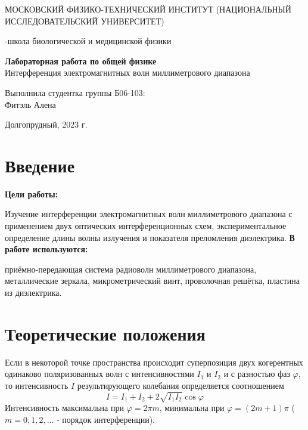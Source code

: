\documentclass[a4paper,12pt]{article}
\begin{document}
\def\figurename{Рисунок}
\begin{titlepage}
\begin{center}
    {\large МОСКОВСКИЙ ФИЗИКО-ТЕХНИЧЕСКИЙ ИНСТИТУТ (НАЦИОНАЛЬНЫЙ ИССЛЕДОВАТЕЛЬСКИЙ УНИВЕРСИТЕТ)}
\end{center}
\begin{center}
    {-школа биологической и медицинской физики}
\end{center}

\vspace{1cm}
{\huge
\begin{center}
    {\bf Лабораторная работа по общей физике}\\
    \vspace{0.5cm}
    Интерференция электромагнитных волн миллиметрового диапазона 
\end{center}
}

\vspace{4cm}
\begin{flushright}
{\LARGE Выполнила студентка группы Б06-103:\\ Фитэль Алена \\}

\end{flushright}
\vspace{9cm}
\begin{center}
    Долгопрудный, 2023 г.
\end{center}
\end{titlepage}
\newpage
\section{Введение}


\textbf{Цели работы:}

\item Изучение интерференции электромагнитных волн миллиметрового диапазона с применением двух оптических интерференционных схем, экспериментальное определение длины волны излучения и показателя преломления диэлектрика.
\textbf{В работе используются:} 

\item приёмно-передающая система радиоволн миллиметрового диапазона, металлические зеркала, микрометрический винт, проволочная решётка, пластина из диэлектрика.
\section{Теоретические положения}
Если в некоторой точке пространства происходит суперпозиция двух когерентных одинаково поляризованных волн с интенсивностями $I_1$ и $I_2$ и с разностью фаз $\varphi$, то интенсивность $I$ результирующего колебания определяется соотношением 
\begin{equation}
    I = I_1 + I_2 + 2\sqrt{I_1 I_2}\cos \varphi
\end{equation}
Интенсивность максимальна при $\varphi = 2\pi m$, минимальна при $\varphi = (2m+1)\pi$ ($m = 0, 1, 2, ...$ - порядок интерференции).
\end{document}
